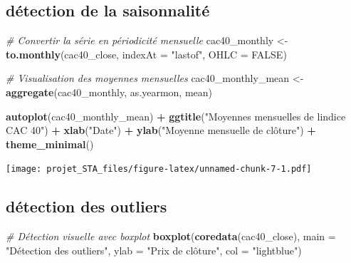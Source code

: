 \documentclass[
]{article}
\newenvironment{Shaded}{\begin{snugshade}}{\end{snugshade}}
\newcommand{\AttributeTok}[1]{\textcolor[rgb]{0.13,0.29,0.53}{#1}}
\newcommand{\CommentTok}[1]{\textcolor[rgb]{0.56,0.35,0.01}{\textit{#1}}}
\newcommand{\ConstantTok}[1]{\textcolor[rgb]{0.56,0.35,0.01}{#1}}
\newcommand{\FunctionTok}[1]{\textcolor[rgb]{0.13,0.29,0.53}{\textbf{#1}}}
\newcommand{\NormalTok}[1]{#1}
\newcommand{\OtherTok}[1]{\textcolor[rgb]{0.56,0.35,0.01}{#1}}
\newcommand{\SpecialCharTok}[1]{\textcolor[rgb]{0.81,0.36,0.00}{\textbf{#1}}}
\newcommand{\StringTok}[1]{\textcolor[rgb]{0.31,0.60,0.02}{#1}}
\begin{document}
\hypertarget{duxe9tection-de-la-saisonnalituxe9}{%
\subsection{détection de la
saisonnalité}\label{duxe9tection-de-la-saisonnalituxe9}}

\begin{Shaded}
\begin{Highlighting}[]
\CommentTok{\# Convertir la série en périodicité mensuelle}
\NormalTok{cac40\_monthly }\OtherTok{\textless{}{-}} \FunctionTok{to.monthly}\NormalTok{(cac40\_close, }\AttributeTok{indexAt =} \StringTok{"lastof"}\NormalTok{, }\AttributeTok{OHLC =} \ConstantTok{FALSE}\NormalTok{)}

\CommentTok{\# Visualisation des moyennes mensuelles}
\NormalTok{cac40\_monthly\_mean }\OtherTok{\textless{}{-}} \FunctionTok{aggregate}\NormalTok{(cac40\_monthly, as.yearmon, mean)}

\FunctionTok{autoplot}\NormalTok{(cac40\_monthly\_mean) }\SpecialCharTok{+}
  \FunctionTok{ggtitle}\NormalTok{(}\StringTok{"Moyennes mensuelles de l\textquotesingle{}indice CAC 40"}\NormalTok{) }\SpecialCharTok{+}
  \FunctionTok{xlab}\NormalTok{(}\StringTok{"Date"}\NormalTok{) }\SpecialCharTok{+}
  \FunctionTok{ylab}\NormalTok{(}\StringTok{"Moyenne mensuelle de clôture"}\NormalTok{) }\SpecialCharTok{+}
  \FunctionTok{theme\_minimal}\NormalTok{()}
\end{Highlighting}
\end{Shaded}

\texttt{[image: projet\_STA\_files/figure-latex/unnamed-chunk-7-1.pdf]}

\hypertarget{duxe9tection-des-outliers}{%
\subsection{détection des outliers}\label{duxe9tection-des-outliers}}

\begin{Shaded}
\begin{Highlighting}[]
\CommentTok{\# Détection visuelle avec boxplot}
\FunctionTok{boxplot}\NormalTok{(}\FunctionTok{coredata}\NormalTok{(cac40\_close), }\AttributeTok{main =} \StringTok{"Détection des outliers"}\NormalTok{,}
        \AttributeTok{ylab =} \StringTok{"Prix de clôture"}\NormalTok{, }\AttributeTok{col =} \StringTok{"lightblue"}\NormalTok{)}
\end{Highlighting}
\end{Shaded}
\end{document}
